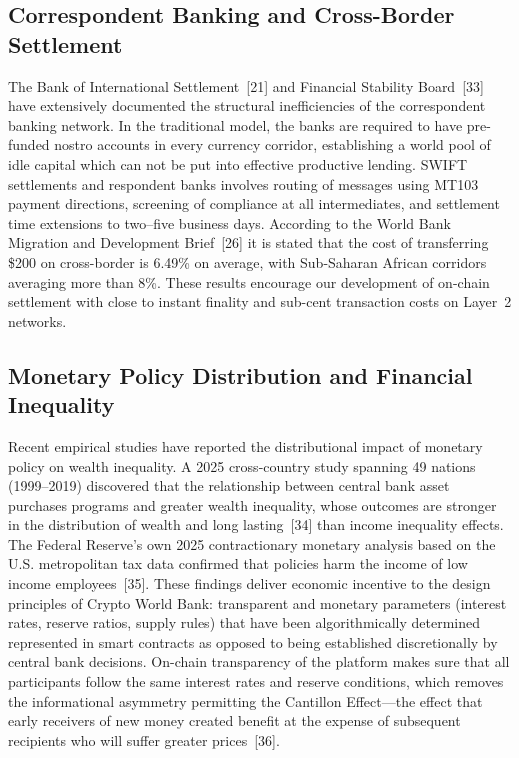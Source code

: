 \documentclass[12pt,a4paper]{report}
\begin{document}
\subsection{Correspondent Banking and Cross-Border Settlement}

The Bank of International Settlement~[21] and Financial Stability Board~[33] have extensively documented the structural inefficiencies of the correspondent banking network. In the traditional model, the banks are required to have pre-funded nostro accounts in every currency corridor, establishing a world pool of idle capital which can not be put into effective productive lending. SWIFT settlements and respondent banks involves routing of messages using MT103 payment directions, screening of compliance at all intermediates, and settlement time extensions to two--five business days. According to the World Bank Migration and Development Brief~[26] it is stated that the cost of transferring \$200 on cross-border is 6.49\% on average, with Sub-Saharan African corridors averaging more than 8\%. These results encourage our development of on-chain settlement with close to instant finality and sub-cent transaction costs on Layer~2 networks.

\subsection{Monetary Policy Distribution and Financial Inequality}

Recent empirical studies have reported the distributional impact of monetary policy on wealth inequality. A 2025 cross-country study spanning 49 nations (1999--2019) discovered that the relationship between central bank asset purchases programs and greater wealth inequality, whose outcomes are stronger in the distribution of wealth and long lasting~[34] than income inequality effects. The Federal Reserve's own 2025 contractionary monetary analysis based on the U.S. metropolitan tax data confirmed that policies harm the income of low income employees~[35]. These findings deliver economic incentive to the design principles of Crypto World Bank: transparent and monetary parameters (interest rates, reserve ratios, supply rules) that have been algorithmically determined represented in smart contracts as opposed to being established discretionally by central bank decisions. On-chain transparency of the platform makes sure that all participants follow the same interest rates and reserve conditions, which removes the informational asymmetry permitting the Cantillon Effect---the effect that early receivers of new money created benefit at the expense of subsequent recipients who will suffer greater prices~[36].
\end{document}
